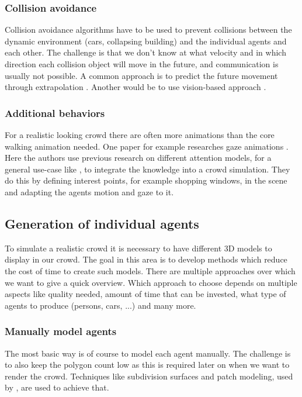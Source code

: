 \documentclass{acmsiggraph}               %
\begin{document}
\subsubsection{Collision avoidance}
Collision avoidance algorithms have to be used to prevent collisions between the dynamic environment (cars, collapsing building) and the individual agents and each other. The challenge is that we don't know at what velocity and in which direction each collision object will move in the future, and communication is usually not possible. 
A common approach is to predict the future movement through extrapolation \cite{karamouzas_predictive_2009}. Another would be to use vision-based approach \cite{ondrej_synthetic-vision_2010}.

\subsubsection{Additional behaviors}
For a realistic looking crowd there are often more animations than the core walking animation needed. One paper for example researches gaze animations \cite{grillon_simulating_2009}. 
Here the authors use previous research on different attention models, for a general use-case like \cite{peters_model_2005}, to integrate the knowledge into a crowd simulation. They do this by defining interest points, for example shopping windows, in the scene and adapting the agents motion and gaze to it. 

\subsection{Generation of individual agents}
To simulate a realistic crowd it is necessary to have different 3D models to display in our crowd. The goal in this area is to develop methods which reduce the cost of time to create such models. There are multiple approaches over which we want to give a quick overview. Which approach to choose depends on multiple aspects like quality needed, amount of time that can be invested, what type of agents to produce (persons, cars, ...) and many more. 
\subsubsection{Manually model agents}
The most basic way is of course to model each agent manually. The challenge is to also keep the polygon count low as this is required later on when we want to render the crowd. Techniques like subdivision surfaces and patch modeling, used by \cite{osullivan_levels_2002}, are used to achieve that.
\end{document}
